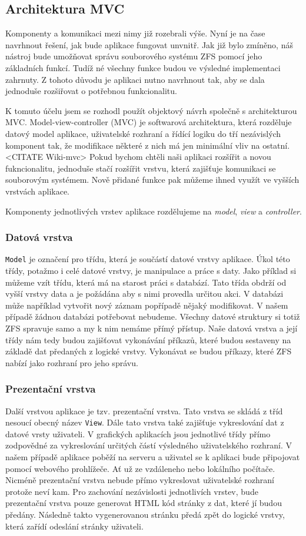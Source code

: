     \subsection{Architektura MVC}
    Komponenty a komunikaci mezi nimy již rozebrali výše. Nyní je na čase navrhnout řešení, jak bude aplikace fungovat unvnitř. Jak již bylo zmíněno, náš nástroj bude umožňovat správu souborového systému ZFS pomocí jeho základních funkcí. Tudíž né všechny funkce budou ve výsledné implementaci zahrnuty. Z tohoto důvodu je aplikaci nutno navrhnout tak, aby se dala jednoduše rozšiřovat o potřebnou funkcionalitu.

    K tomuto účelu jsem se rozhodl použít objektový návrh společně s architekturou MVC. Model-view-controller (MVC) je softwarová architektura, která rozděluje datový model aplikace, uživatelské rozhraní a řídící logiku do tří nezávislých komponent tak, že modifikace některé z nich má jen minimální vliv na ostatní.<CITATE Wiki-mvc> Pokud bychom chtěli naši aplikaci rozšířit a novou fukncionalitu, jednoduše stačí rozšířit vrstvu, která zajišťuje komunikaci se souborovým systémem. Nově přidané funkce pak můžeme ihned využít ve vyšších vrstvách aplikace.

    Komponenty jednotlivých vrstev aplikace rozdělujeme na \emph{model}, \emph{view} a \emph{controller}.

        \subsubsection{Datová vrstva}
        \verb|Model| je označení pro třídu, která je součástí datové vrstvy aplikace. Úkol této třídy, potažmo i celé datové vrstvy, je manipulace a práce s daty. Jako příklad si můžeme vzít třídu, která má na starost práci s databází. Tato třída obdrží od vyšší vrstvy data a je požádána aby s nimi provedla určitou akci. V databázi může například vytvořit nový záznam popřípadě nějaký modifikovat. V našem případě žádnou databázi potřebovat nebudeme. Všechny datové struktury si totiž ZFS spravuje samo a my k nim nemáme přímý přístup. Naše datová vrstva a její třídy nám tedy budou zajišťovat vykonávání příkazů, které budou sestaveny na základě dat předaných z logické vrstvy. Vykonávat se budou příkazy, které ZFS nabízí jako rozhraní pro jeho správu.
        \subsubsection{Prezentační vrstva}
        Další vrstvou aplikace je tzv. prezentační vrstva. Tato vrstva se skládá z tříd nesoucí obecný název \verb|View|. Dále tato vrstva také zajišťuje vykreslování dat z datové vrsty uživateli. V grafických aplikacích jsou jednotlivé třídy přímo zodpovědné za vykreslování určitých částí výsledného uživatelského rozhraní. V našem případě aplikace poběží na serveru a uživatel se k aplikaci bude připojovat pomocí webového prohlížeče. Ať už ze vzdáleneho nebo lokálního počítače. Nicméně prezentační vrstva nebude přímo vykreslovat uživatelské rozhraní protože neví kam. Pro zachování nezávislosti jednotlivích vrstev, bude prezentační vrstva pouze generovat HTML kód stránky z dat, které jí budou předány. Následně takto vygenerovanou stránku předá zpět do logické vrstvy, která zařídí odeslání stránky uživateli.
